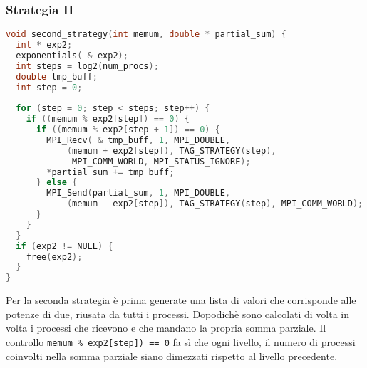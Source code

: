 \documentclass[a4paper,11pt]{book}
\begin{document}
\subsubsection{Strategia II}
\begin{lstlisting}[language=C]
void second_strategy(int memum, double * partial_sum) {
  int * exp2;
  exponentials( & exp2);
  int steps = log2(num_procs);
  double tmp_buff;
  int step = 0;
  
  for (step = 0; step < steps; step++) {
    if ((memum % exp2[step]) == 0) {
      if ((memum % exp2[step + 1]) == 0) {
        MPI_Recv( & tmp_buff, 1, MPI_DOUBLE, 
            (memum + exp2[step]), TAG_STRATEGY(step),
             MPI_COMM_WORLD, MPI_STATUS_IGNORE);
        *partial_sum += tmp_buff;
      } else {
        MPI_Send(partial_sum, 1, MPI_DOUBLE, 
            (memum - exp2[step]), TAG_STRATEGY(step), MPI_COMM_WORLD);
      }
    }
  }
  if (exp2 != NULL) {
    free(exp2);
  }
}
\end{lstlisting}
Per la seconda strategia è prima generate una lista di valori che corrisponde alle potenze di due, riusata da tutti i processi. Dopodichè sono calcolati di volta in volta i processi che ricevono e che mandano la propria somma parziale. Il controllo \verb|memum % exp2[step]) == 0| fa sì che ogni livello, il numero di processi coinvolti nella somma parziale siano dimezzati rispetto al livello precedente.
\end{document}
